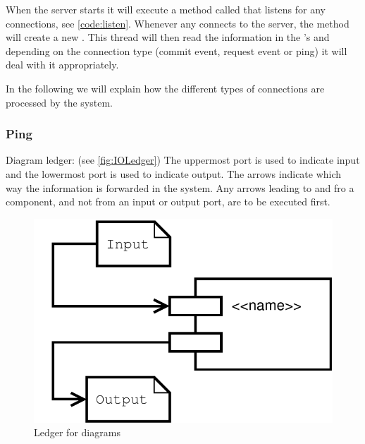 When the server starts it will execute a method called  that listens for any connections, see \autoref{code:listen}.
Whenever any  connects to the server, the  method will create a new .
This thread will then read the information in the 's  and depending on the connection type (commit event, request event or ping) it will deal with it appropriately.



In the following we will explain how the different types of connections are processed by the system.


\subsubsection*{Ping}
Diagram ledger: (see \autoref{fig:IOLedger})\newline
The uppermost port is used to indicate input and the lowermost port is used to indicate output. The arrows indicate which way the information is forwarded in the system. Any arrows leading to and fro a component, and not from an input or output port, are to be executed first.	\newline
\begin{figure}[H]
	\centering
		\includegraphics[scale=0.40]{images/ledger} %
	\caption{Ledger for diagrams}
	\label{fig:IOLedger}
\end{figure}

